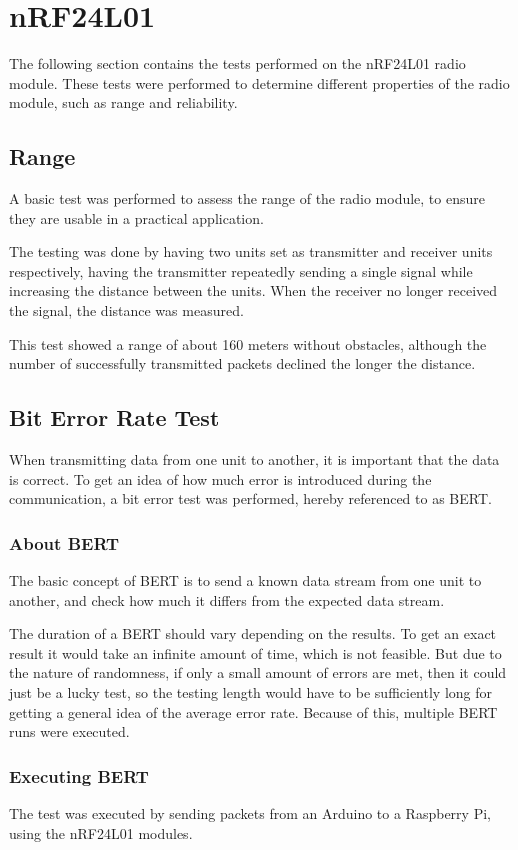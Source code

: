 \section{nRF24L01}
The following section contains the tests performed on the nRF24L01 radio module. These tests were performed to determine different properties of the radio module, such as range and reliability.

\subsection{Range}
A basic test was performed to assess the range of the radio module, to ensure they are usable in a practical application. 

The testing was done by having two units set as transmitter and receiver units respectively, having the transmitter repeatedly sending a single signal while increasing the distance between the units. When the receiver no longer received the signal, the distance was measured.

This test showed a range of about 160 meters without obstacles, although the number of successfully transmitted packets declined the longer the distance.

\subsection{Bit Error Rate Test}
When transmitting data from one unit to another, it is important that the data is correct. To get an idea of how much error is introduced during the communication, a bit error test was performed, hereby referenced to as BERT.

\subsubsection*{About BERT}
The basic concept of BERT is to send a known data stream from one unit to another, and check how much it differs from the expected data stream.

The duration of a BERT should vary depending on the results. To get an exact result it would take an infinite amount of time, which is not feasible. But due to the nature of randomness, if only a small amount of errors are met, then it could just be a lucky test, so the testing length would have to be sufficiently long for getting a general idea of the average error rate. Because of this, multiple BERT runs were executed.

\subsubsection*{Executing BERT} 
The test was executed by sending packets from an Arduino to a Raspberry Pi, using the nRF24L01 modules.

